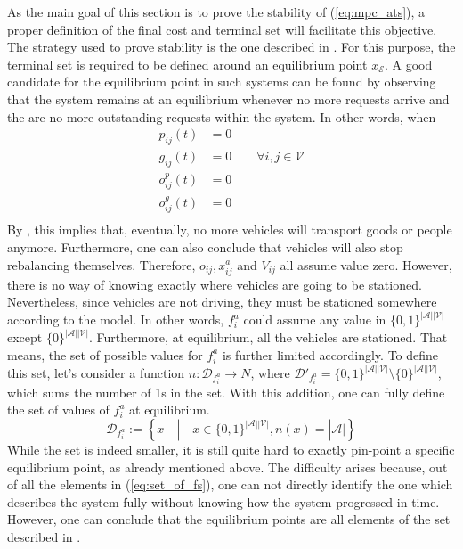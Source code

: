 As the main goal of this section is to prove the stability of (\ref{eq:mpc_ats}), a proper definition of the final cost and terminal set will facilitate this objective. The strategy used to prove stability is the one described in . For this purpose, the terminal set is required to be defined around an equilibrium point $x_\mathcal{E}$. A good candidate for the equilibrium point in such systems can be found by observing that the system remains at an equilibrium whenever no more requests arrive and the are no more outstanding requests within the system. In other words, when 
\begin{align*}
	p_{ij}(t) &=0 \\
	g_{ij}(t) &=0\quad\quad \forall i,j\in\mathcal{V}\\
	o^p_{ij}(t) &=0\\
	o^g_{ij}(t) &=0\\
\end{align*}
By , this implies that, eventually, no more vehicles will transport goods or people anymore. Furthermore, one can also conclude that vehicles will also stop rebalancing themselves. Therefore, $o_{ij}, x_{ij}^a$ and $V_{ij}$ all assume value zero. However, there is no way of knowing exactly where vehicles are going to be stationed. Nevertheless, since vehicles are not driving, they must be stationed somewhere according to the model. In other words, $f^a_{i}$ could assume any value in $\{0,1\}^{|\mathcal{A}||\mathcal{V}|} $ except $ \{0\}^{|\mathcal{A}||\mathcal{V}|}$. Furthermore, at equilibrium, all the vehicles are stationed. That means, the set of possible values for $f^a_{i}$ is further limited accordingly. To define this set, let's consider a function $n : \mathcal{D}_{f^a_{i}} \rightarrow N$, where $\mathcal{D}'_{f^a_{i}} = \{0,1\}^{|\mathcal{A}||\mathcal{V}|} \setminus \{0\}^{|\mathcal{A}||\mathcal{V}|}$, which sums the number of 1s in the set. With this addition, one can fully define the set of values of $f^a_{i}$ at equilibrium. 
\begin{equation}
\mathcal{D}_{f^a_{i}} := 	\left\{
	x \quad | \quad x \in \{0,1\}^{|\mathcal{A}||\mathcal{V}|}, n(x) = |\mathcal{A}|
	\right\}\label{eq:set_of_fs}
\end{equation}
While the set is indeed smaller, it is still quite hard to exactly pin-point a specific equilibrium point, as already mentioned above. The difficulty arises because, out of all the elements in (\ref{eq:set_of_fs}), one can not directly identify the one which describes the system fully without knowing how the system progressed in time. However, one can conclude that the equilibrium points are all elements of the set described in . 
